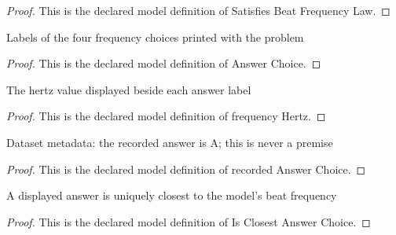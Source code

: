 \begin{proof}
  This is the declared model definition of Satisfies Beat Frequency Law.
\end{proof}
\begin{definition}
  \label{def:physics:phyx-mini-0172:phyxminiproblems-problemphyxmini0172-answerchoice}
  Labels of the four frequency choices printed with the problem
\end{definition}
\begin{proof}
  This is the declared model definition of Answer Choice.
\end{proof}
\begin{definition}
  \label{def:physics:phyx-mini-0172:phyxminiproblems-problemphyxmini0172-answerchoice-frequencyhertz}
  The hertz value displayed beside each answer label
\end{definition}
\begin{proof}
  This is the declared model definition of frequency Hertz.
\end{proof}
\begin{definition}
  \label{def:physics:phyx-mini-0172:phyxminiproblems-problemphyxmini0172-recordedanswerchoice}
  Dataset metadata: the recorded answer is A; this is never a premise
\end{definition}
\begin{proof}
  This is the declared model definition of recorded Answer Choice.
\end{proof}
\begin{definition}
  \label{def:physics:phyx-mini-0172:phyxminiproblems-problemphyxmini0172-isclosestanswerchoice}
  A displayed answer is uniquely closest to the model's beat frequency
\end{definition}
\begin{proof}
  This is the declared model definition of Is Closest Answer Choice.
\end{proof}
